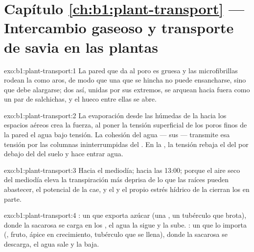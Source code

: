 \section*{Capítulo \ref{ch:b1:plant-transport} --- Intercambio gaseoso y transporte de savia en las plantas}

\begin{solution}{exo:b1:plant-transport:1}
La pared que da al poro es gruesa y las microfibrillas rodean la  como
aros, de modo que una  que se hincha no puede ensancharse, sino que
debe alargarse; dos  así, unidas por sus extremos, se arquean hacia
fuera como un par de salchichas, y el hueco entre ellas se abre.
\end{solution}

\begin{solution}{exo:b1:plant-transport:2}
La evaporación desde las  húmedas de la  hacia los
espacios aéreos crea la fuerza, al poner la tensión superficial de los poros
finos de la pared el agua bajo tensión. La cohesión del agua --- sus  --- transmite esa tensión por las columnas ininterrumpidas del
. En la , la tensión rebaja el  del  por
debajo del del suelo y hace entrar agua.
\end{solution}

\begin{solution}{exo:b1:plant-transport:3}
Hacia el mediodía; hacia las 13:00; porque el aire seco del mediodía eleva
la transpiración más deprisa de lo que las raíces pueden abastecer, el
potencial de la  cae, y el  y el propio estrés hídrico de
la  cierran los  en parte.
\end{solution}

\begin{solution}{exo:b1:plant-transport:4}
: un  que exporta azúcar (una , un tubérculo que brota),
donde la sacarosa se carga en los , el agua la sigue y la
 sube. : un  que lo importa (, fruto, ápice en
crecimiento, tubérculo que se llena), donde la sacarosa se descarga, el agua
sale y la  baja.
\end{solution}

